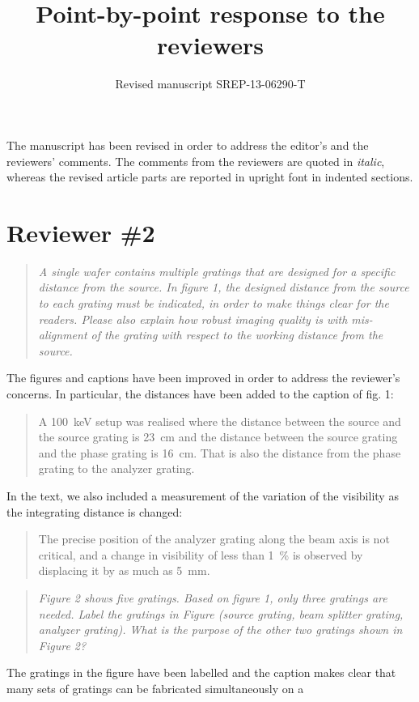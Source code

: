 \documentclass[a4paper,english]{scrartcl}
\title{Point-by-point response to the reviewers}
\author{Revised manuscript SREP-13-06290-T}
\date{}
\newenvironment{reviewerquote}{\begin{quote}\itshape}{\end{quote}}
\begin{document}
\maketitle

\noindent
The manuscript has been revised in order to address the editor's and the reviewers'
comments.
The comments from the reviewers are quoted in \emph{italic}, whereas the
revised article parts are reported in upright font in indented sections.
\section*{Reviewer \#2}
\begin{reviewerquote}
    A single wafer contains multiple gratings that are designed for a specific distance from the source. In figure 1, the designed distance from the source to each grating must be indicated, in order to make things clear for the readers. Please also explain how robust imaging quality is with mis-alignment of the grating with respect to the working distance from the source.
\end{reviewerquote}
The figures and captions have been improved in order to address the
reviewer's concerns. In particular, the distances have been added to the
caption of fig. 1:
\begin{quote}
    A \SI{100}{\kilo\eV} setup was realised where the distance
        between the source and the source grating is \SI{23}{\centi\metre}
    and the distance between the source grating and the phase grating is
    \SI{16}{\centi\metre}. That is also the distance from the phase grating
to the analyzer grating.
\end{quote}
In the text, we also included a measurement of the variation of the
visibility as the integrating distance is changed:
\begin{quote}
    The precise position of the analyzer grating along the beam axis is not
critical, and a change in visibility of less than \SI{1}{\percent} is
observed by displacing it by as much as \SI{5}{\milli\metre}.
\end{quote}
\begin{reviewerquote}
    Figure 2 shows five gratings. Based on figure 1, only three gratings are needed. Label the gratings in Figure (source grating, beam splitter grating, analyzer grating). What is the purpose of the other two gratings shown in Figure 2?
\end{reviewerquote}
The gratings in the figure have been labelled and the caption makes clear
that many sets of gratings can be fabricated simultaneously on a
\end{document}
